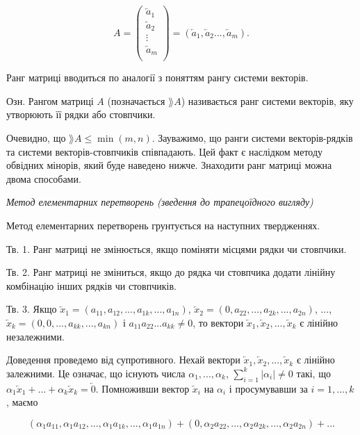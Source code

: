 $$A = \begin{pmatrix}
	\overleftarrow{a}_1 \\
	\overleftarrow{a}_2 \\
	\vdots \\
	\overleftarrow{a}_m \\
\end{pmatrix}  = (\overleftarrow{a}_1, \overleftarrow{a}_2 ..., \overleftarrow{a}_m).$$


Ранг матриці вводиться по аналогії з поняттям рангу системи векторів.

Озн. Рангом матриці $A$ (позначається $\rang A$) називається ранг системи
векторів, яку утворюють її рядки або стовпчики.

Очевидно, що $\rang A \leqslant \min(m,n)$. Зауважимо, що ранги системи векторів-рядків
та системи векторів-стовпчиків співпадають. Цей факт є наслідком методу
обвідних мінорів, який буде наведено нижче. Знаходити ранг матриці можна двома
способами.

\textit{Метод елементарних перетворень (зведення до трапецоїдного вигляду)}

Метод елементарних перетворень грунтується на наступних твердженнях.


Тв. 1. Ранг матриці не змінюється, якщо поміняти місцями рядки чи
стовпчики.


Тв. 2. Ранг матриці не зміниться, якщо до рядка чи стовпчика додати лінійну
комбінацію інших рядків чи стовпчиків.


Тв. 3. Якщо $\overleftarrow{x}_1 = (a_{11}, a_{12}, ..., a_{1k}, ..., a_{1n})$, 
$\overleftarrow{x}_2 = (0, a_{22}, ..., a_{2k}, ..., a_{2n})$, ..., 
$\overleftarrow{x}_k = (0, 0, ..., a_{kk}, ..., a_{kn})$ і $a_{11} a_{22} ... a_{kk} \neq 0$, то
вектори $\overleftarrow{x}_1, \overleftarrow{x}_2, ..., \overleftarrow{x}_k$ є лінійно
незалежними.


Доведення проведемо від супротивного. Нехай вектори $\overleftarrow{x}_1, \overleftarrow{x}_2, ..., \overleftarrow{x}_k$ є лінійно
залежними. Це означає, що існують числа $\alpha_1, ..., \alpha_k$, $\sum\limits_{i=1}^k |\alpha_i| \neq 0$
такі, що $\alpha_1 \overleftarrow{x}_1 + ... + \alpha_k \overleftarrow{x}_k = \overleftarrow{0}$.
Помноживши вектор $\overleftarrow{x}_i$ на $\alpha_i$ і просумувавши за $i = 1, ..., k$,
маємо

$$(\alpha_1 a_{11}, \alpha_1 a_{12}, ..., \alpha_1 a_{1k}, ..., \alpha_1 a_{1n})
	+ (0, \alpha_2 a_{22}, ..., \alpha_2 a_{2k}, ..., \alpha_2 a_{2n}) + ...$$

